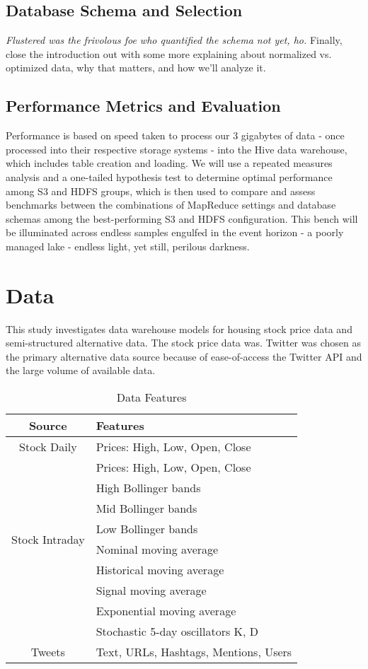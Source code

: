 \documentclass[journal]{IEEEtran}
\begin{document}
\subsection{Database Schema and Selection}
\textit{Flustered was the frivolous foe who quantified the schema not yet, ho.} Finally, close the introduction out with some more explaining about normalized vs. optimized data, why that matters, and how we'll analyze it.
\\
\subsection{Performance Metrics and Evaluation}
Performance is based on speed taken to process our 3 gigabytes of data - once processed into their respective storage systems - into the Hive data warehouse, which includes table creation and loading. We will use a repeated measures analysis and a one-tailed hypothesis test to determine optimal performance among S3 and HDFS groups, which is then used to compare and assess benchmarks between the combinations of MapReduce settings and database schemas among the best-performing S3 and HDFS configuration. This bench will be illuminated across endless samples engulfed in the event horizon - a poorly managed lake - endless light, yet still, perilous darkness.




\section{Data}

This study investigates data warehouse models for housing stock price data and semi-structured alternative data. 
The stock price data was.
Twitter was chosen as the primary alternative data source because of ease-of-access the Twitter API and the large volume of available data.

\begin{table}
	\renewcommand{\arraystretch}{1.3}
	\caption{Data Features}
	\label{DataFeatures}
	\centering
	\begin{tabular}{c|l}
		\hline
		Source       & Features\\
		\hline
		\hline
		Stock Daily  & Prices: High, Low, Open, Close\\
		\hline
		\multirow{8}{*}{Stock Intraday} &  Prices: High, Low, Open, Close \\
		&  High Bollinger bands\\
		&  Mid Bollinger bands\\
		&  Low Bollinger bands\\ 
		&  Nominal moving average\\
		&  Historical moving average\\
		&  Signal moving average\\ 
		&  Exponential moving average\\
		&  Stochastic 5-day oscillators K, D\\
		\hline
		Tweets       & Text, URLs, Hashtags, Mentions, Users\\
		\hline
	\end{tabular}
\end{table}
\end{document}
